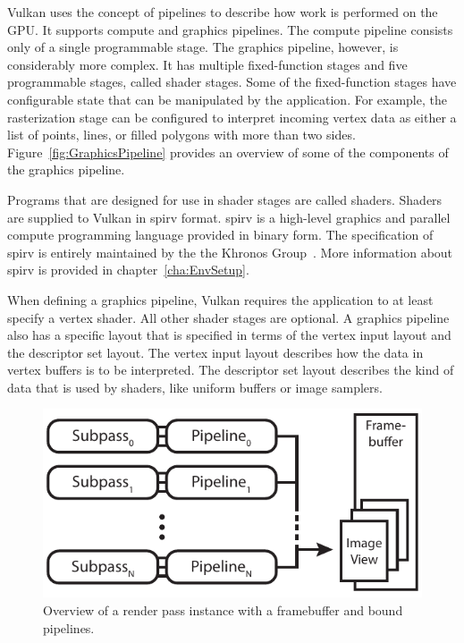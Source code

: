     Vulkan uses the concept of pipelines to describe how work is performed on the GPU.
    It supports compute and graphics pipelines.
    The compute pipeline consists only of a single programmable stage.
    The graphics pipeline, however, is considerably more complex.
    It has multiple fixed-function stages and five programmable stages, called shader stages.
    Some of the fixed-function stages have configurable state that can be manipulated by the \gls{application}.
    For example, the rasterization stage can be configured to interpret incoming vertex data as either a list of points, lines, or filled polygons with more than two sides.
    Figure~\ref{fig:GraphicsPipeline} provides an overview of some of the components of the graphics pipeline.

    Programs that are designed for use in shader stages are called shaders.
    Shaders are supplied to Vulkan in \gls{spirv} format.
    \gls{spirv} is a high-level graphics and parallel compute programming language provided in binary form.
    The specification of \gls{spirv} is entirely maintained by the the Khronos Group~\cite{spirvspecprov}.
    More information about \gls{spirv} is provided in chapter~\ref{cha:EnvSetup}.

    When defining a graphics pipeline, Vulkan requires the \gls{application} to at least specify a vertex shader.
    All other shader stages are optional.
    A graphics pipeline also has a specific layout that is specified in terms of the vertex input layout and the descriptor set layout.
    The vertex input layout describes how the data in vertex buffers is to be interpreted.
    The descriptor set layout describes the kind of data that is used by shaders, like uniform buffers or image samplers.


    \begin{figure}
      \label{fig:RenderPassInstanceSample}
      \centering
      \includegraphics[width=\textwidth]{Main/Images/RenderPassInstanceSample}
      \caption{Overview of a render pass instance with a framebuffer and bound pipelines.}
    \end{figure}

